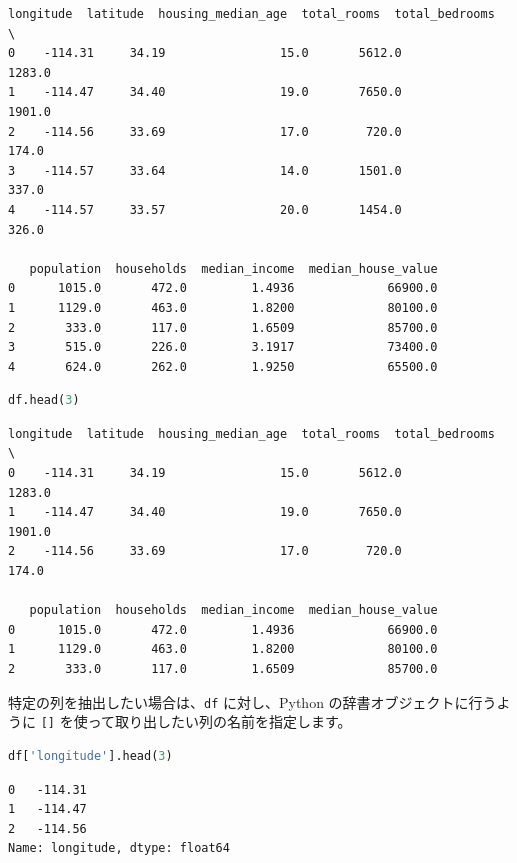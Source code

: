 \begin{lstlisting}[style=outputcell]
   longitude  latitude  housing_median_age  total_rooms  total_bedrooms  \
0    -114.31     34.19                15.0       5612.0          1283.0   
1    -114.47     34.40                19.0       7650.0          1901.0   
2    -114.56     33.69                17.0        720.0           174.0   
3    -114.57     33.64                14.0       1501.0           337.0   
4    -114.57     33.57                20.0       1454.0           326.0   

   population  households  median_income  median_house_value  
0      1015.0       472.0         1.4936             66900.0  
1      1129.0       463.0         1.8200             80100.0  
2       333.0       117.0         1.6509             85700.0  
3       515.0       226.0         3.1917             73400.0  
4       624.0       262.0         1.9250             65500.0  
\end{lstlisting}

\begin{lstlisting}[style=codecell,language=Python]
df.head(3)
\end{lstlisting}

\begin{lstlisting}[style=outputcell]
   longitude  latitude  housing_median_age  total_rooms  total_bedrooms  \
0    -114.31     34.19                15.0       5612.0          1283.0   
1    -114.47     34.40                19.0       7650.0          1901.0   
2    -114.56     33.69                17.0        720.0           174.0   

   population  households  median_income  median_house_value  
0      1015.0       472.0         1.4936             66900.0  
1      1129.0       463.0         1.8200             80100.0  
2       333.0       117.0         1.6509             85700.0  
\end{lstlisting}

特定の列を抽出したい場合は、\texttt{df} に対し、Python の辞書オブジェクトに行うように \texttt{[]} を使って取り出したい列の名前を指定します。


\begin{lstlisting}[style=codecell,language=Python]
df['longitude'].head(3)
\end{lstlisting}

\begin{lstlisting}[style=outputcell]
0   -114.31
1   -114.47
2   -114.56
Name: longitude, dtype: float64
\end{lstlisting}

